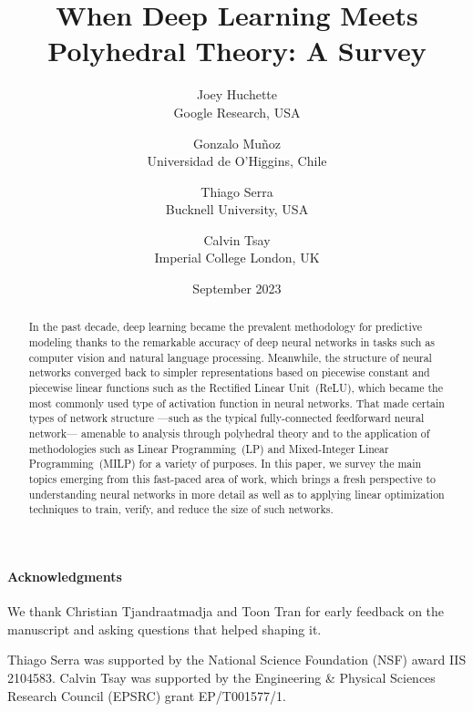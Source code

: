 \documentclass{article}
\title{When Deep Learning Meets Polyhedral Theory: A Survey}
\author{
Joey Huchette\\{\footnotesize Google Research, USA} \and
Gonzalo Mu\~{n}oz\\{\footnotesize Universidad de O'Higgins, Chile} \and 
Thiago Serra\\{\footnotesize Bucknell University, USA} \and
Calvin Tsay\\{\footnotesize Imperial College London, UK}
}
\date{September 2023}
\begin{document}
\maketitle

\begin{abstract}
\noindent 
In the past decade, deep learning became the prevalent methodology for predictive modeling thanks to the remarkable accuracy of deep neural networks in tasks such as computer vision and natural language processing. 
Meanwhile, the structure of neural networks converged back to simpler representations based on piecewise constant and piecewise linear functions such as the Rectified Linear Unit~(ReLU), 
which became the most commonly used type of activation function in neural networks. 
That made certain types of network structure ---such as the typical fully-connected feedforward neural network--- amenable to analysis 
through polyhedral theory and to the application of methodologies such as Linear Programming~(LP) and Mixed-Integer Linear Programming~(MILP) for a variety of purposes. 
In this paper, 
we survey the main topics emerging from this fast-paced area of work, 
% 
which brings a fresh perspective to understanding neural networks in more detail as well as to applying linear optimization techniques to train, verify, and reduce the size of such networks.  
\end{abstract}













\paragraph{Acknowledgments} We thank Christian Tjandraatmadja and Toon Tran for early feedback on the manuscript and asking questions that helped shaping it. 

Thiago Serra was  supported by
the National Science Foundation (NSF) award IIS 2104583. 
Calvin Tsay was supported by the Engineering \& Physical Sciences Research Council (EPSRC) grant EP/T001577/1. 

%

\end{document}
